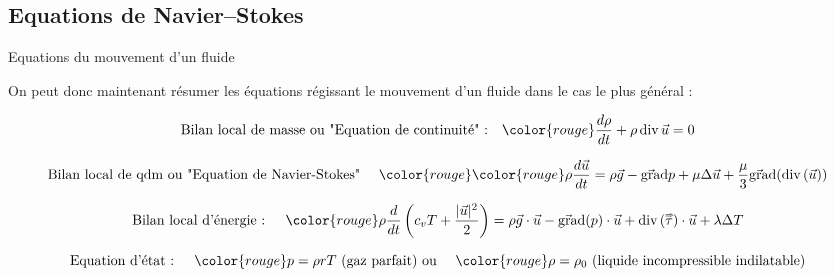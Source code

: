 \subsection{Equations de Navier--Stokes}


\begin{frame}{Equations du mouvement d'un fluide}

\small

On peut donc maintenant résumer les équations régissant le mouvement d'un fluide dans le cas le plus général :

\pause 

\begin{equation*}
\mbox{Bilan local de masse ou "Equation de continuité" :} \quad 	\color{rouge}
		\ddt{\rho} + \rho \, \divergence \myvec{u} = 0
\end{equation*}


\begin{equation*}
\mbox{Bilan local de qdm ou "Equation de Navier-Stokes" }   \quad 	\color{rouge}
\color{rouge}
\rho  \ddt{\myvec{u}} 
= 
\rho \myvec{g}  - \gradient p + \mu  \Delta \myvec{u} + \frac{\mu}{3} \gradient (\divergence( \myvec{u}))
\end{equation*}

 \begin{equation*}
\mbox{Bilan local d'énergie : } \quad
\color{rouge}
		\rho \ddt{} \left( c_v T + \frac{|\vec{u}|^2}{2} \right) 
		= \rho \vec{g} \cdot \vec{u} 
		- \gradient ( p) \cdot  \vec{u}  
		+ \divergence ( \mytensor{\tau}) \cdot \vec{u}  
		 +  \lambda \Delta T
\end{equation*}

\begin{equation*}
\mbox{Equation d'état : } \quad { \color{rouge} p = \rho r T} \mbox{ (gaz parfait) ou }  \quad { \color{rouge} \rho = \rho_0} \mbox{ (liquide incompressible indilatable)} 
\end{equation*}

\end{frame}

